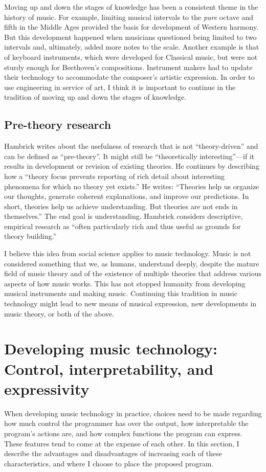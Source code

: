 Moving up and down the stages of knowledge has been a consistent theme in the history of music. For example, limiting musical intervals to the \textit{pure} octave and fifth in the Middle Ages provided the basis for development of Western harmony. But this development happened when musicians questioned being limited to two intervals and, ultimately, added more notes to the scale. Another example is that of keyboard instruments, which were developed for Classical music, but were not sturdy enough for Beethoven's compositions. Instrument makers had to update their technology to accommodate the composer's artistic expression. In order to use engineering in service of art, I think it is important to continue in the tradition of moving up and down the stages of knowledge.

\subsection{Pre-theory research}
\label{sec:pretheory}
Hambrick writes about the usefulness of research that is not ``theory-driven'' and can be defined as ``pre-theory''. It might still be ``theoretically interesting''---if it results in development or revision of existing theories. He continues by describing how a ``theory focus prevents reporting of rich detail about interesting phenomena for which no theory yet exists.'' He writes: ``Theories help us organize our thoughts, generate coherent explanations, and improve our predictions. In short, theories help us achieve understanding. But theories are not ends in themselves.'' The end goal is understanding.
Hambrick considers descriptive, empirical research as ``often particularly rich and thus useful as grounds for theory building.'' \cite{hambrick2007field}

I believe this idea from social science applies to music technology. Music is not considered something that we, as humans, understand deeply, despite the mature field of music theory and of the existence of multiple theories that address various aspects of how music works. This has not stopped humanity from developing musical instruments and making music. Continuing this tradition in music technology might lead to new means of musical expression, new developments in music theory, or both of the above.

\section{Developing music technology: Control, interpretability, and expressivity}
When developing music technology in practice, choices need to be made regarding how much control the programmer has over the output, how interpretable the program's actions are, and how complex functions the program can express. These features tend to come at the expense of each other. In this section, I describe the advantages and disadvantages of increasing each of these characteristics, and where I choose to place the proposed program. 

